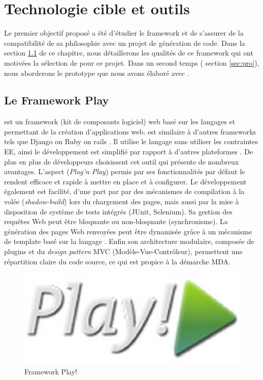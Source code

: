 \chapter{Technologie cible et outils}\label{chap:met}
Le premier objectif proposé a été d'étudier le framework \kwplay et de s'assurer de la compatibilité de sa philosophie avec un projet de génération de code. Dans la section \ref{sec:pla} de ce chapitre, nous détaillerons les qualités de ce framework qui ont motivées la sélection de \kwplay pour ce projet. Dans un second temps (\cf{} section \ref{sec:pro}), nous aborderons le prototype que nous avons élaboré avec \kwplay. 


\section{Le Framework Play}\label{sec:pla}

\kwplay{} est un framework (kit de composants logiciel) web basé sur les langages \kwjava{} et \kwscala{} permettant de la création d'applications web. \kwplay{} est similaire à d'autres frameworks tels que Django \cite{django} ou Ruby on rails \cite{ruby}. Il utilise le langage \kwjava{} sans utiliser les contraintes \kwjava{} EE, ainsi le développement est simplifié par rapport à d'autres plateformes \kwjava{}. De plus en plus de développeurs choisissent cet outil  qui présente de nombreux avantages. L'aspect  (\textit{Plug'n Play}) permis par ses fonctionnalités par défaut le rendent efficace et rapide à mettre en place et à configurer. Le développement également est facilité, d'une part par par des mécanismes de compilation à la volée (\textit{shadow-build}) lors du chargement des pages, mais aussi par la mise à disposition de système de tests intégrés (JUnit, Selenium). Sa gestion des requêtes Web peut être bloquante ou non-bloquante (synchronisme). La génération des pages Web renvoyées peut être dynamisée grâce à un mécanisme de template basé sur la langage \kwscala{}. Enfin son architecture modulaire, composée de plugins et du \textit{design pattern} MVC (Modèle-Vue-Contrôleur), permettent une répartition claire du code source, ce qui est propice à la démarche MDA. %

\begin{figure}[htb]
  \centering
  \includegraphics[scale=.3]{img/logoPlay.eps}
  \caption{Framework Play!}
  \label{fig:play}
\end{figure}


